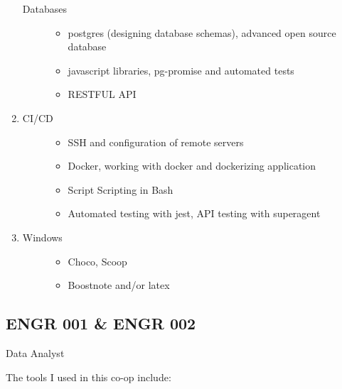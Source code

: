 \begin{enumerate}
\begin{description}
  \item[Databases]
  \begin{itemize}
  \tightlist
  \item
    postgres (designing database schemas), advanced open source database
  \item
    javascript libraries, pg-promise and automated tests
  \item
    RESTFUL API
  \end{itemize}
  \end{description}
\item
  \begin{description}
  \item[CI/CD]
  \begin{itemize}
  \tightlist
  \item
    SSH and configuration of remote servers
  \item
    Docker, working with docker and dockerizing application
  \item
    Script Scripting in Bash
  \item
    Automated testing with jest, API testing with superagent
  \end{itemize}
  \end{description}
\item
  \begin{description}
  \item[Windows]
  \begin{itemize}
  \tightlist
  \item
    Choco, Scoop
  \item
    Boostnote and/or latex
  \end{itemize}
  \end{description}
\end{enumerate}


\subsection{ENGR 001 \& ENGR 002}\label{engr-001-engr-002}

Data Analyst

The tools I used in this co-op include:

